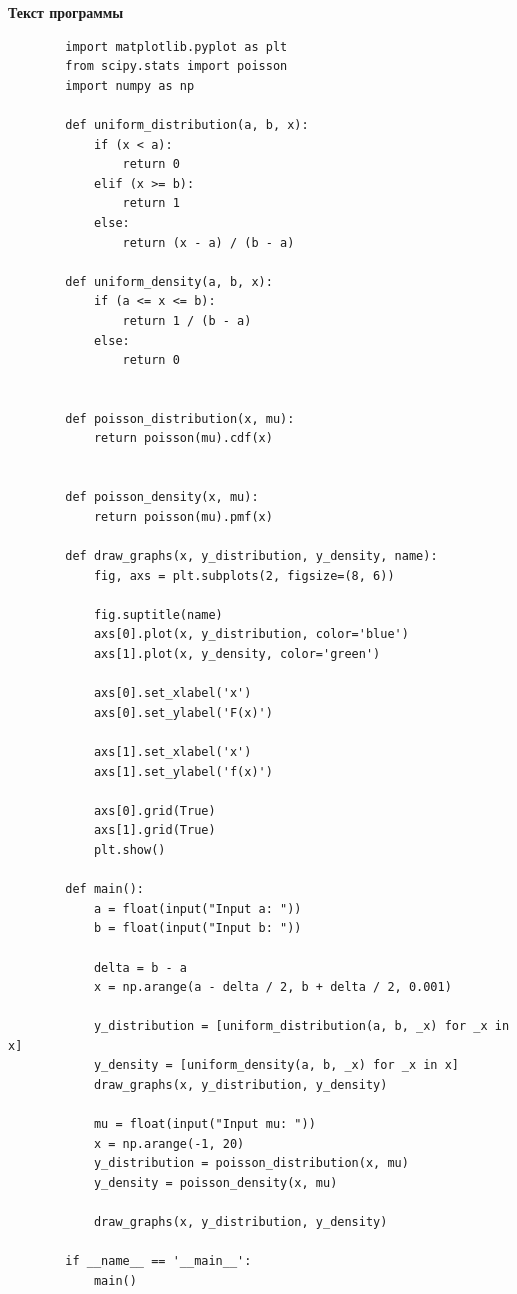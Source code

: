 \documentclass[14pt, a4paper]{extarticle}
\begin{document}
	
	
	\newpage
	\textbf{Текст программы}
	\begin{lstlisting}
		import matplotlib.pyplot as plt
		from scipy.stats import poisson
		import numpy as np
		
		def uniform_distribution(a, b, x):
			if (x < a):
				return 0
			elif (x >= b):
				return 1
			else:
				return (x - a) / (b - a)
		
		def uniform_density(a, b, x):
			if (a <= x <= b):
				return 1 / (b - a)
			else:
				return 0
		
		
		def poisson_distribution(x, mu):
			return poisson(mu).cdf(x)
		
		
		def poisson_density(x, mu):
			return poisson(mu).pmf(x)
		
		def draw_graphs(x, y_distribution, y_density, name):
			fig, axs = plt.subplots(2, figsize=(8, 6))
			
			fig.suptitle(name)
			axs[0].plot(x, y_distribution, color='blue')
			axs[1].plot(x, y_density, color='green')
			
			axs[0].set_xlabel('x')
			axs[0].set_ylabel('F(x)')
			
			axs[1].set_xlabel('x')
			axs[1].set_ylabel('f(x)')
			
			axs[0].grid(True)
			axs[1].grid(True)
			plt.show()
		
		def main():
			a = float(input("Input a: "))
			b = float(input("Input b: "))
			
			delta = b - a
			x = np.arange(a - delta / 2, b + delta / 2, 0.001)
			
			y_distribution = [uniform_distribution(a, b, _x) for _x in x]
			y_density = [uniform_density(a, b, _x) for _x in x]
			draw_graphs(x, y_distribution, y_density)
			
			mu = float(input("Input mu: "))    
			x = np.arange(-1, 20)
			y_distribution = poisson_distribution(x, mu)
			y_density = poisson_density(x, mu)
		
			draw_graphs(x, y_distribution, y_density)
		
		if __name__ == '__main__':
			main()
	\end{lstlisting}	
\end{document}
